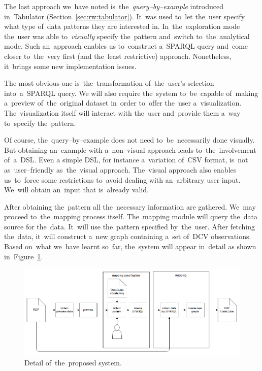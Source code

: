 The last approach we~have noted is~the~\emph{query--by--example} introduced in~Tabulator (Section~\ref{sec:rw:tabulator}). It~was used to~let the~user specify what type of~data patterns they are 
interested in. In~the~exploration mode the~user was able to~\emph{visually} 
specify the~pattern and~switch to~the~analytical mode. Such an~approach enables 
us to~construct a~SPARQL query and~come closer to~the~very first (and the~least restrictive) 
approach. Nonetheless, it~brings some new implementation issues.

The most obvious one is~the~transformation of~the~user's selection into~a~SPARQL query. 
We will also require the~system to~be~capable of~making a~preview of~the~original dataset in~order to~offer the~user a~visualization. The~visualization 
itself will interact with the~user and~provide them a~way to~specify the~pattern.

Of course, the~query--by--example does not need to~be~necessarily done visually. But 
obtaining an~example with a~non--visual approach leads to~the~involvement of~a~DSL. Even 
a simple DSL, for instance a~variation of~CSV format, is~not as~user--friendly as~the~visual approach. The~visual approach also enables us~to~force some 
restrictions to~avoid dealing with an~arbitrary user input. We~will 
obtain an~input that is~already valid.

After obtaining the~pattern all the~necessary information are gathered. We~may proceed to~the~mapping process itself. The~mapping module will query the~data source for the~data. It~will use the~pattern specified by~the~user. After 
fetching the~data, it~will construct a~new graph containing a~set of~DCV 
observations. Based on~what we~have learnt so~far, the~system will appear in~detail 
as shown in~Figure~\ref{fig:generic-mapping-detail}.

\begin{figure}
	\centering
	\includegraphics[width=140mm]{img/generic-mapping-detail.png}
	\caption{Detail of~the~proposed system.}
	\label{fig:generic-mapping-detail}
\end{figure}


